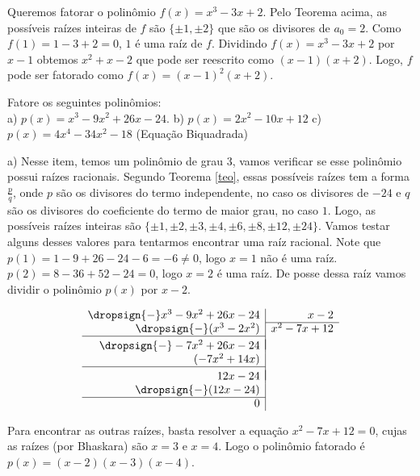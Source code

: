 \begin{enumerate}
\begin{exe} Queremos fatorar o polinômio $f(x)=x^3-3x+2$. Pelo Teorema acima, as possíveis raízes inteiras de $f$ são $\{\pm1,\pm2\}$ que são os divisores de $a_0=2$. Como $f(1)=1-3+2=0$, $1$ é uma raíz de $f$. Dividindo $f(x)=x^3-3x+2$ por $x-1$ obtemos $x^2+x-2$ que pode ser reescrito como $(x-1)(x+2)$. Logo, $f$ pode ser fatorado como $f(x)= (x-1)^2(x+2)$.
\end{exe}

\begin{exe}
	Fatore os seguintes polinômios:  \\
	a) $p(x)=x^3-9x^2+26x-24$. \hspace{1cm} b) $p(x)=2x^2-10x+12$  \hspace{1cm}  c) $p(x)= 4x^4-34x^2-18$ (Equação Biquadrada) \\
\end{exe}
\color{red}
a) Nesse item, temos um polinômio de grau 3, vamos verificar se esse polinômio possui raízes racionais. Segundo Teorema \ref{teo}, essas possíveis raízes tem a forma $\frac{p}{q}$, onde $p$ são os divisores do termo independente, no caso os divisores de $-24$ e $q$ são os divisores do coeficiente do termo de maior grau, no caso $1$. Logo, as possíveis raízes inteiras são $\{ \pm 1, \pm 2, \pm 3, \pm 4, \pm 6, \pm 8, \pm 12, \pm 24\}$. Vamos testar alguns desses valores para tentarmos encontrar uma raíz racional.
Note que $p(1)=1-9+26-24-6=-6 \neq 0$, logo $x=1$ não é uma raíz. $p(2)=8-36+52-24=0$, logo $x=2$ é uma raíz. De posse dessa raíz vamos dividir o polinômio $p(x)$ por $x-2$.

\[
\begin{array}{r|r}
	\dropsign{-} x^3-9x^2+26x-24 & x-2 \\ \cline{2-2}
	\dropsign{-}( x^3-2x^2)  & x^2-7x+12 \\ \cline{1-1} \\[\dimexpr-\normalbaselineskip+\jot]
	\dropsign{-} -7x^2+26x-24 \\
	(-7x^2+14x) \\ \cline{1-1} \\[\dimexpr-\normalbaselineskip+\jot]
	12x-24 \\
	\dropsign{-} (12x-24)
\\	\cline{1-1}
	0
\end{array}
\]

Para encontrar as outras raízes, basta resolver a equação $x^2-7x+12=0$, cujas as raízes (por Bhaskara) são $x=3$ e $x=4$. Logo o polinômio fatorado é $p(x)=(x-2)(x-3)(x-4)$. \\


\end{enumerate}
